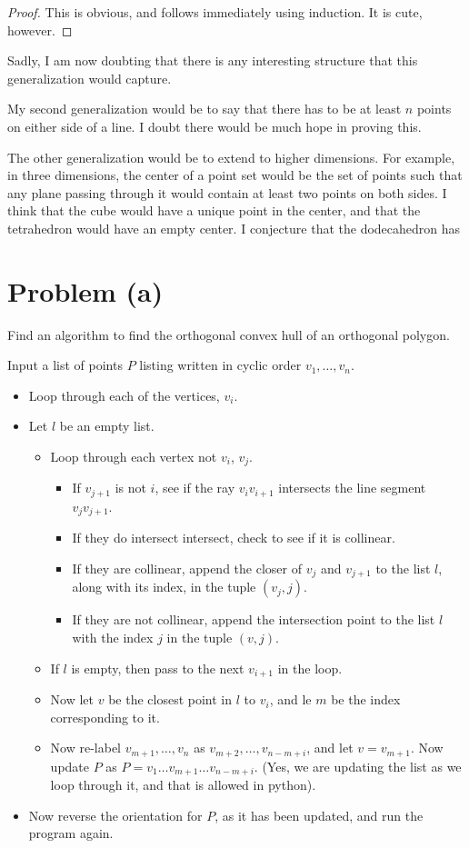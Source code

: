 \documentclass[12pt]{article}
\theoremstyle{definition}
\begin{document}
\begin{proof}
This is obvious, and follows immediately using induction. It is cute, however.
\end{proof}

Sadly, I am now doubting that there is any interesting structure that this generalization would capture.


My second generalization would be to say that there has to be at least $n$ points on either side of a line. I doubt there would be much hope in proving this.

The other generalization would be to extend to higher dimensions. For example, in three dimensions, the center of a point set would be the set of points such that any plane passing through it would contain at least two points on both sides. I think that the cube would have a unique point in the center, and that the tetrahedron would have an empty center. I conjecture that the dodecahedron has 


\section{Problem (a)}

Find an algorithm to find the orthogonal convex hull of an orthogonal polygon.


Input a list of points $P$ listing written in cyclic order $v_1,\dots, v_n$.

\begin{itemize}
\item Loop through each of the vertices, $v_i$.
\item  Let $l$ be an empty list.
\begin{itemize}
\item Loop through each vertex not $v_i$, $v_j$. 
\begin{itemize}
\item If $v_{j+1}$ is not $i$, see if the ray $v_iv_{i+1}$ intersects the line segment $v_jv_{j+1}$. \item If they do intersect intersect, check to see if it is collinear. 
\item If they are collinear, append the closer of $v_j$ and $v_{j+1}$ to the list $l$, along with its index, in the tuple $(v_j, j)$.
\item If they are not collinear, append the intersection point to the list $l$ with the index $j$ in the tuple $(v, j)$.
\end{itemize}
\item If $l$ is empty, then pass to the next $v_{i+1}$ in the loop.

\item Now let $v$ be the closest point in $l$ to $v_i$, and le $m$ be the index corresponding to it.
\item Now re-label $v_{m+1},\dots, v_n$ as $v_{m+2},\dots, v_{n - m + i}$, and let $v = v_{m+1}$. Now update $P$ as $P = v_1\dots v_{m+1} \dots v_{n-m + i} $. (Yes, we are updating the list as we loop through it, and that is allowed in python). 
\end{itemize}
\item Now reverse the orientation for $P$, as it has been updated, and run the program again.
\end{itemize}
\end{document}
